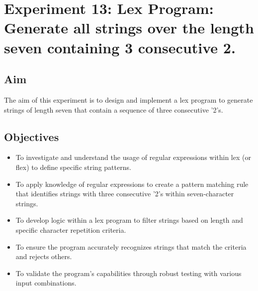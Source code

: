 \documentclass[12pt]{article}
\begin{document}
\newpage
\section*{Experiment 13: Lex Program: Generate all strings over the length seven containing 3 consecutive 2.}

\subsection*{Aim}
The aim of this experiment is to design and implement a lex program to generate strings of length seven that contain a sequence of three consecutive '2's.

\subsection*{Objectives}
\begin{itemize}
    \item To investigate and understand the usage of regular expressions within lex (or flex) to define specific string patterns.
    \item To apply knowledge of regular expressions to create a pattern matching rule that identifies strings with three consecutive '2's within seven-character strings.
    \item To develop logic within a lex program to filter strings based on length and specific character repetition criteria.
    \item To ensure the program accurately recognizes strings that match the criteria and rejects others.
    \item To validate the program's capabilities through robust testing with various input combinations.
\end{itemize}
\end{document}
